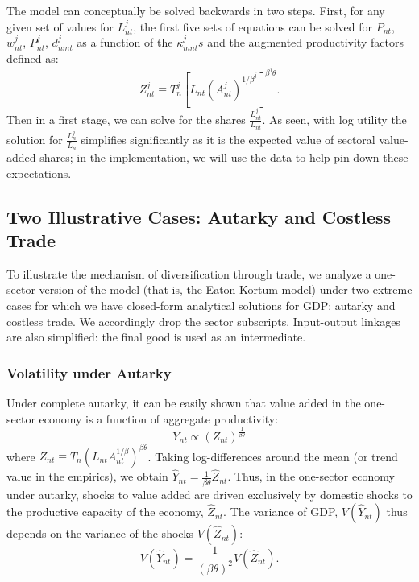 \documentclass[12pt]{article}
\begin{document}
The model can conceptually be solved backwards in two steps. First, for any
given set of values for $L_{nt}^{j}$, the first five sets of equations can
be solved for $P_{nt}$, $w_{nt}^{j}$, $P_{nt}^{j}$, $d_{nmt}^{j}$ as a
function of the $\kappa _{mnt}^{j}s$ and the augmented productivity factors
defined as: 
\begin{equation}
Z_{nt}^{j}\equiv T_{n}^{j}\left[ L_{nt}\left( A_{nt}^{j}\right) ^{1/\beta
^{j}}\right] ^{\beta ^{j}\theta }.  \label{productivityfactor}
\end{equation}%
Then in a first stage, we can solve for the shares $\frac{L_{nt}^{j}}{L_{nt}}
$. As seen, with log utility the solution for $\frac{L_{n}^{j}}{L_{n}}$
simplifies significantly as it is the expected value of sectoral value-added
shares; in the implementation, we will use the data to help pin down these
expectations.

\subsection{Two Illustrative Cases: Autarky and Costless Trade}

To illustrate the mechanism of diversification through trade, we analyze a
one-sector version of the model (that is, the Eaton-Kortum model) under two
extreme cases for which we have closed-form analytical solutions for GDP:
autarky and costless trade. We accordingly drop the sector subscripts.
Input-output linkages are also simplified: the final good is used as an
intermediate.

\subsubsection{Volatility under Autarky}

Under complete autarky, it can be easily shown that value added in the
one-sector economy is a function of aggregate productivity: 
\begin{equation*}
Y_{nt}\propto \left( Z_{nt}\right) ^{\frac{1}{\beta \theta }}
\end{equation*}%
where $Z_{nt}\equiv T_{n}\left( L_{nt}A_{nt}^{1/\beta }\right) ^{\beta
\theta }$. Taking log-differences around the mean (or trend value in the
empirics), we obtain $\hat{Y}_{nt}=\frac{1}{\beta \theta }\hat{Z}_{nt}.$
Thus, in the one-sector economy under autarky, shocks to value added are
driven exclusively by domestic shocks to the productive capacity of the
economy, $\hat{Z}_{nt}.$ The variance of GDP, $V(\hat{Y}_{nt})$ thus depends
on the variance of the shocks $V(\hat{Z}_{nt})$: 
\begin{equation*}
V(\hat{Y}_{nt})=\frac{1}{\left( \beta \theta \right) ^{2}}V(\hat{Z}_{nt}).
\end{equation*}
\end{document}
